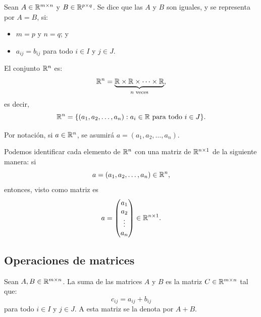 \documentclass[a4,11pt]{aleph-notas}
\begin{document}
\begin{prop}
    Sean $A \in \Mat[\R]{m}{n}$ y $B \in \Mat[\R]{p}{q}$. Se dice que las $A$ y $B$ son iguales, y se representa por $A=B$, si:
    \begin{itemize}
    \item 
        $m=p$ y $n=q$; y
    \item 
        $a_{ij}=b_{ij}$ para todo $i\in I$ y $j \in J$.
    \end{itemize}
\end{prop}

\begin{defi}[Vectores]
    El conjunto $\R^n$ es:
    \[
        \R^n=\underbrace{\R\times\R\times\cdots\times\R}_{n\text{ veces}},
    \]
    es decir,
    \[
        \R^n=\{(a_1,a_2,\ldots,a_n):a_i\in\R\text{ para todo }i \in J\}.
    \]
\end{defi}

\begin{advertencia}
    Por notación, si $a\in\R^n$, se asumirá $a=(a_1,a_2,\ldots,a_n)$.
\end{advertencia}

\begin{advertencia}
    Podemos identificar cada elemento de $\R^n$ con una matriz de $\Mat[\R]{n}{1}$ de la siguiente manera: si
    \[
        a = (a_1,a_2,\ldots,a_n) \in \R^n,
    \]
    entonces, visto como matriz es
    \[
        a = 
        \begin{pmatrix}
            a_1\\a_2\\
            \vdots\\a_n
        \end{pmatrix}
        \in \Mat[\R]{n}{1}.
    \]
\end{advertencia}

\subsection{Operaciones de matrices}

\begin{defi}
    Sean $A, B \in \Mat[\R]{m}{n}$. La suma de las matrices $A$ y $B$ es la matriz $C\in \Mat[\R]{m}{n}$ tal que:
    \[ 
        c_{ij} = a_{ij} + b_{ij}
    \]
    para todo $i \in I$ y $j \in J$. A esta matriz se la denota por $A+B$.
\end{defi}
\end{document}

